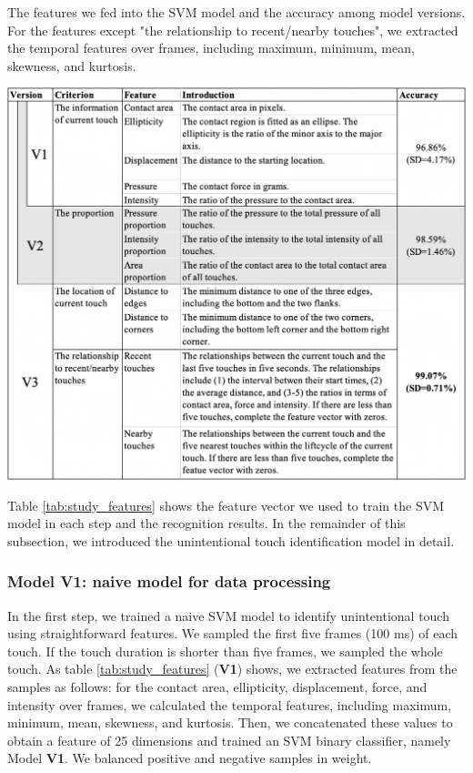 \begin{table}[!tbh]
	\caption{The features we fed into the SVM model and the accuracy among model versions. For the features except "the relationship to recent/nearby touches", we extracted the temporal features over frames, including maximum, minimum, mean, skewness, and kurtosis.}
	\includegraphics[width=1.0\linewidth]{figures/features.png}
	\centering
	\label{tab:study_features}
\end{table}

Table \ref{tab:study_features} shows the feature vector we used to train the SVM model in each step and the recognition results. In the remainder of this subsection, we introduced the unintentional touch identification model in detail.


\subsubsection{Model  V1: naive model for data processing}

In the first step, we trained a naive SVM model to identify unintentional touch using straightforward features. We sampled the first five frames (100 ms) of each touch. If the touch duration is shorter than five frames, we sampled the whole touch. As table  \ref{tab:study_features} (\textbf{V1}) shows, we extracted features from the samples as follows: for the contact area, ellipticity, displacement, force, and intensity over frames, we calculated the temporal features, including maximum, minimum, mean, skewness, and kurtosis. Then, we concatenated these values to obtain a feature of 25 dimensions and trained an SVM binary classifier, namely Model \textbf{V1}. We balanced positive and negative samples in weight.

